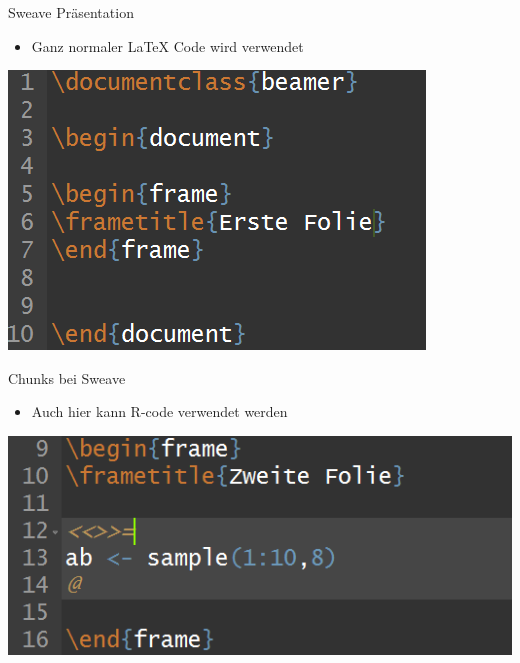 \documentclass[ignorenonframetext,]{beamer}
\providecommand{\tightlist}{%
\setlength{\itemsep}{0pt}\setlength{\parskip}{0pt}}
\begin{document}
\begin{frame}{Sweave Präsentation}

\begin{itemize}
\tightlist
\item
  Ganz normaler LaTeX Code wird verwendet
\end{itemize}

\includegraphics{./tex2pdf.956/f0b3937ec5719dee8af0820e3319c115f1f85dc1.png}

\end{frame}

\begin{frame}{Chunks bei Sweave}

\begin{itemize}
\tightlist
\item
  Auch hier kann R-code verwendet werden
\end{itemize}

\includegraphics{./tex2pdf.956/16eacd9128dd06a03d6e05d75dee57d98cb1fe25.png}

\end{frame}
\end{document}
